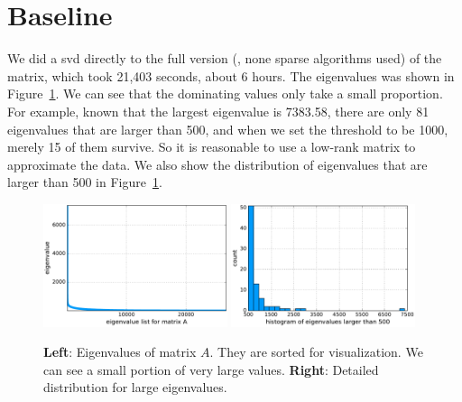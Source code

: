 
\section{Baseline}

We did a svd directly to the full version
(\ie, none sparse algorithms used) of the matrix,
which took 21,403 seconds, about $6$ hours.
The eigenvalues was shown in Figure~\ref{fig:eig}.
We can see that the dominating values only take a small proportion.
For example,
known that the largest eigenvalue is 7383.58,
there are only 81 eigenvalues that are larger than 500,
and when we set the threshold to be 1000,
merely 15 of them survive.
So it is reasonable to use a low-rank matrix to approximate the data.
We also show the distribution of eigenvalues that are larger than 500
in Figure~\ref{fig:eig}.

\begin{figure}[!ht]
	\centering
	\includegraphics[width=0.48\textwidth]{fig/eigs.pdf}
    \hskip 0.2cm
	\includegraphics[width=0.48\textwidth]{fig/eig_large.pdf}
	\caption{\small
  		\textbf{Left}: Eigenvalues of matrix $A$.
          They are sorted for visualization.
          We can see a small portion of very large values.
        \textbf{Right}: Detailed distribution for large eigenvalues.}
	\label{fig:eig}
\end{figure}
